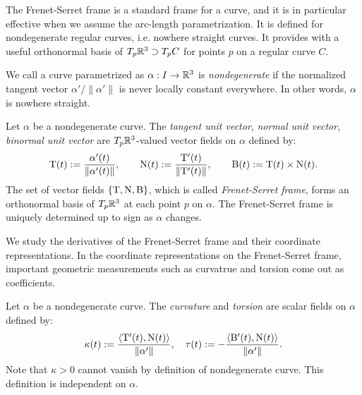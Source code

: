 \documentclass{../exp}
\def\a{\alpha}
\begin{document}
The Frenet-Serret frame is a standard frame for a curve, and it is in particular effective when we assume the arc-length parametrization.
It is defined for nondegenerate regular curves, i.e. nowhere straight curves.
It provides with a useful orthonormal basis of $T_p\mathbb{R}^3\supset T_pC$ for points $p$ on a regular curve $C$.
\begin{defn}
We call a curve parametrized as $\a:I\to\R^3$ is \emph{nondegenerate} if the normalized tangent vector $\a'/\|\a'\|$ is never locally constant everywhere.
In other words, $\a$ is nowhere straight.
\end{defn}

\begin{defn}
Let $\a$ be a nondegenerate curve.
The \emph{tangent unit vector}, \emph{normal unit vector}, \emph{binormal unit vector} are $T_p\mathbb{R}^3$-valued vector fields on $\a$ defined by:
\[\rT(t):=\frac{\a'(t)}{\|\a'(t)\|},\qquad\rN(t):=\frac{\rT'(t)}{\|\rT'(t)\|},\qquad\rB(t):=\rT(t)\times\rN(t).\]
The set of vector fields $\{\mathrm{T},\mathrm{N},\mathrm{B}\}$, which is called \emph{Frenet-Serret frame}, forms an orthonormal basis of $T_p\mathbb{R}^3$ at each point $p$ on $\a$.
The Frenet-Serret frame is uniquely determined up to sign as $\a$ changes.
\end{defn}

We study the derivatives of the Frenet-Serret frame and their coordinate representations.
In the coordinate representations on the Frenet-Serret frame, important geometric measurements such as curvatrue and torsion come out as coefficients.

\begin{defn}
Let $\a$ be a nondegenerate curve.
The \emph{curvature} and \emph{torsion} are scalar fields on $\a$ defined by:
\[\kappa(t):=\frac{\<\rT'(t),\rN(t)\>}{\|\a'\|},\quad\tau(t):=-\frac{\<\rB'(t),\rN(t)\>}{\|\a'\|}.\]
Note that $\kappa>0$ cannot vanish by definition of nondegenerate curve.
This definition is independent on $\a$.
\end{defn}
\end{document}
